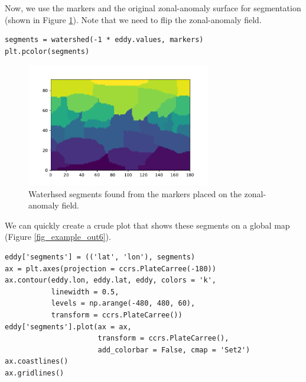 \documentclass[final, double]{ua-thesis}
\begin{document}
Now, we use the markers and the original zonal-anomaly surface for segmentation (shown in Figure \ref{fig_example_out5}). Note that we need to flip the zonal-anomaly field.

\begin{singlespacing}
\begin{verbatim}
segments = watershed(-1 * eddy.values, markers)
plt.pcolor(segments)
\end{verbatim}
\end{singlespacing}

\begin{figure}[h]
 \centerline{\includegraphics[width=19pc]{p2figures/fig_example_out5.pdf}}
  \caption{Waterhsed segments found from the markers placed on the zonal-anomaly field.}\label{fig_example_out5}
\end{figure}

We can quickly create a crude plot that shows these segments on a global map (Figure \ref{fig_example_out6}).

\begin{singlespacing}
\begin{verbatim}
eddy['segments'] = (('lat', 'lon'), segments)
ax = plt.axes(projection = ccrs.PlateCarree(-180))
ax.contour(eddy.lon, eddy.lat, eddy, colors = 'k', 
           linewidth = 0.5,
           levels = np.arange(-480, 480, 60), 
           transform = ccrs.PlateCarree())
eddy['segments'].plot(ax = ax, 
                      transform = ccrs.PlateCarree(),
                      add_colorbar = False, cmap = 'Set2')
ax.coastlines()
ax.gridlines()
\end{verbatim}
\end{singlespacing}
\end{document}
